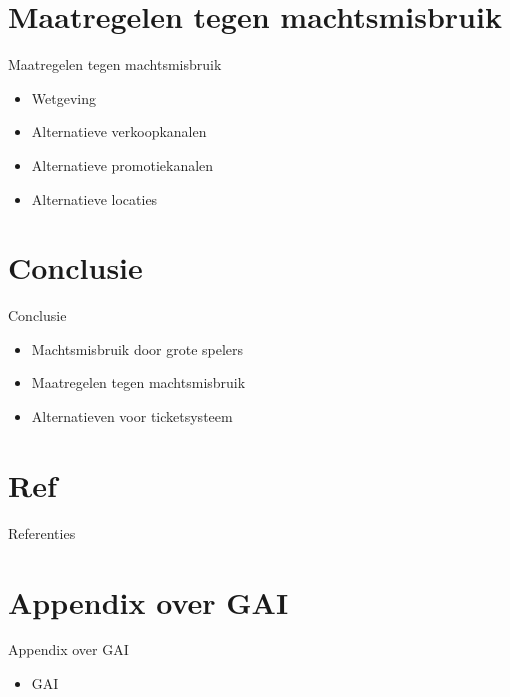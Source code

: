 \documentclass{beamer}
\begin{document}
\section[Maatregelen]{Maatregelen tegen machtsmisbruik}
\begin{frame}{Maatregelen tegen machtsmisbruik}
    \begin{itemize}
        \item Wetgeving
        \item Alternatieve verkoopkanalen
        \item Alternatieve promotiekanalen
        \item Alternatieve locaties
    \end{itemize}
\end{frame}
    
\section{Conclusie}
\begin{frame}{Conclusie}
    \begin{itemize}
        \item Machtsmisbruik door grote spelers
        \item Maatregelen tegen machtsmisbruik
        \item Alternatieven voor ticketsysteem
    \end{itemize}
\end{frame}
    
\section{Ref}
\begin{frame}{Referenties}
\end{frame}

\section[Appendix]{Appendix over GAI}
\begin{frame}{Appendix over GAI}
    \begin{itemize}
        \item GAI
    \end{itemize}
\end{frame}
\end{document}

